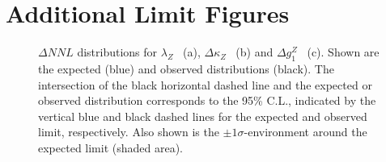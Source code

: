 \section{Additional Limit Figures}

\begin{figure}
	\centering
	\caption[Delta-log-likelihood distributions for the three aTGC parameters in vertex parametrization]{$\Delta NNL$ distributions for $\lambda_Z$ \ (a), $\Delta \kappa_Z$ \ (b) and $\Delta g_1^Z$ \ (c). Shown are the expected (blue) and observed distributions (black). The intersection of the black horizontal dashed line and the expected or observed distribution corresponds to the 95\% C.L., indicated by the vertical blue and black dashed lines for the expected and observed limit, respectively. Also shown is the $\pm 1\sigma$-environment around the expected limit (shaded area).}
\end{figure}

